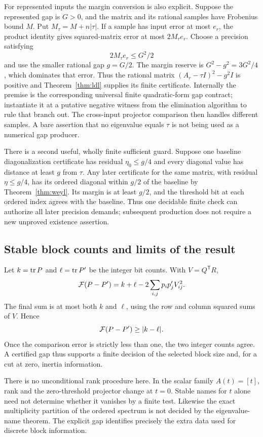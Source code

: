 For represented inputs the margin conversion is also explicit. Suppose the represented gap is $G>0$, and the matrix and its rational samples have Frobenius bound $M$. Put $M_\tau=M+n|\tau|$. If a sample has input error at most $e_r$, the product identity gives squared-matrix error at most $2M_\tau e_r$. Choose a precision satisfying
\[
 2M_\tau e_r\le G^2/2
\]
and use the smaller rational gap $g=G/2$. The margin reserve is $G^2-g^2=3G^2/4$, which dominates that error. Thus the rational matrix $(A_r-\tau I)^2-g^2I$ is positive and Theorem~\ref{thm:ldl} supplies its finite certificate. Internally the premise is the corresponding universal finite quadratic-form gap contract; instantiate it at a putative negative witness from the elimination algorithm to rule that branch out. The cross-input projector comparison then handles different samples. A bare assertion that no eigenvalue equals $\tau$ is not being used as a numerical gap producer.

There is a second useful, wholly finite sufficient guard. Suppose one baseline diagonalization certificate has residual $\eta_0\le g/4$ and every diagonal value has distance at least $g$ from $\tau$. Any later certificate for the same matrix, with residual $\eta\le g/4$, has its ordered diagonal within $g/2$ of the baseline by Theorem~\ref{thm:weyl}. Its margin is at least $g/2$, and the threshold bit at each ordered index agrees with the baseline. Thus one decidable finite check can authorize all later precision demands; subsequent production does not require a new unproved existence assertion.

\subsection{Stable block counts and limits of the result}

Let $k=\operatorname{tr} P$ and $\ell=\operatorname{tr} P'$ be the integer bit counts. With $V=Q^{\mathsf T}R$,
\[
 \mathcal F(P-P')=k+\ell-2\sum_{i,j}p_ip'_jV_{ij}^2.
\]
The final sum is at most both $k$ and $\ell$, using the row and column squared sums of $V$. Hence
\[
 \mathcal F(P-P')\ge|k-\ell|.
\]
Once the comparison error is strictly less than one, the two integer counts agree. A certified gap thus supports a finite decision of the selected block size and, for a cut at zero, inertia information.

There is no unconditional rank procedure here. In the scalar family $A(t)=[t]$, rank and the zero-threshold projector change at $t=0$. Stable names for $t$ alone need not determine whether it vanishes by a finite test. Likewise the exact multiplicity partition of the ordered spectrum is not decided by the eigenvalue-name theorem. The explicit gap identifies precisely the extra data used for discrete block information.
